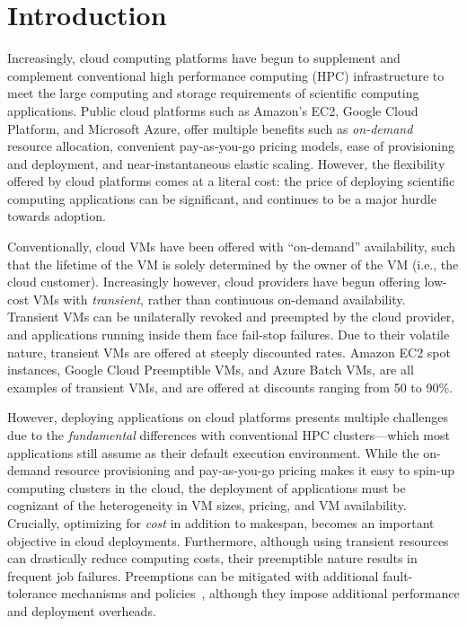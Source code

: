 \section{Introduction}
\label{sec:intro}

Increasingly, cloud computing platforms have begun to supplement and complement conventional high performance computing (HPC) infrastructure to meet the large computing and storage requirements of scientific computing applications. Public cloud platforms such as Amazon's EC2, Google Cloud Platform, and Microsoft Azure, offer multiple benefits such as \emph{on-demand} resource allocation, convenient pay-as-you-go pricing models, ease of provisioning and deployment, and near-instantaneous elastic scaling. 
However, the flexibility offered by cloud platforms comes at a literal cost: the price of deploying scientific computing applications can be significant, and continues to be a major hurdle towards adoption. 

Conventionally, cloud VMs have been offered with ``on-demand'' availability, such that the lifetime of the VM is solely determined by the owner of the VM (i.e., the cloud customer). 
Increasingly however, cloud providers have begun offering low-cost VMs with \emph{transient}, rather than continuous on-demand availability. 
Transient VMs can be unilaterally revoked and preempted by the cloud provider, and applications running inside them face fail-stop failures. 
Due to their volatile nature, transient VMs are offered at steeply discounted rates. Amazon EC2 spot instances, Google Cloud Preemptible VMs, and Azure Batch VMs, are all examples of transient VMs, and are offered at discounts ranging from 50 to 90\%.  

However, deploying applications on cloud platforms presents multiple challenges due to the  \emph{fundamental} differences with conventional HPC clusters---which most applications still assume as their default execution environment.
While the on-demand resource provisioning and pay-as-you-go pricing makes it easy to spin-up computing clusters in the cloud, the deployment of applications must be cognizant of the heterogeneity in VM sizes, pricing, and VM availability. 
Crucially, optimizing for \emph{cost} in addition to makespan,  becomes an important objective in cloud deployments. 
Furthermore, although using transient resources can drastically reduce computing costs, their preemptible nature results in frequent job failures. 
Preemptions can be mitigated with additional fault-tolerance mechanisms and policies~\cite{flint, marathe2014exploiting}, although they impose additional performance and deployment overheads. 

